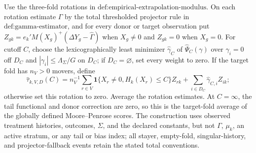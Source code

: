 Use the three-fold rotations in \(\text{def:empirical-extrapolation-modulus}\). On each rotation estimate \(\Gamma\) by the total thresholded projector rule in \(\text{def:gamma-estimator}\), and for every donor or target observation put \(Z_{gk}=e_k'M(X_g)^+(\Delta Y_g-\widehat\Gamma)\) when \(X_g\ne0\) and \(Z_{gk}=0\) when \(X_g=0\). For cutoff \(C\), choose the lexicographically least minimizer \(\widehat\gamma_C\) of \(\widehat\Psi_C(\gamma)\) over \(\gamma_i=0\) off \(D_C\) and \(|\gamma_i|\le\Lambda_\Sigma/G\) on \(D_C\); if \(D_C=\varnothing\), set every weight to zero. If the target fold has \(n_V>0\) movers, define \[\widehat\tau_{k,V,D}(C)=n_V^{-1}\sum_{r\in V}\mathbf 1\{X_r\ne0,H_k(X_r)\le C\}Z_{rk}+\sum_{i\in D_C}\widehat\gamma_{C,i}Z_{ik};\] otherwise set this rotation to zero. Average the rotation estimates. At \(C=\infty\), the tail functional and donor correction are zero, so this is the target-fold average of the globally defined Moore--Penrose scores. The construction uses observed treatment histories, outcomes, \(\Sigma\), and the declared constants, but not \(\Gamma\), \(\mu_k\), an active stratum, or any tail or bias index; all stayer, empty-fold, singular-history, and projector-fallback events retain the stated total conventions.